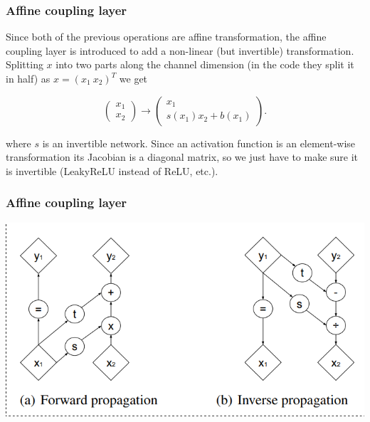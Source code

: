 \documentclass{beamer}
\begin{document}
\begin{frame}
  \frametitle{Affine coupling layer}

  Since both of the previous operations are affine transformation, the affine
  coupling layer is introduced to add a non-linear (but invertible)
  transformation. Splitting $x$ into two parts along the channel dimension (in
  the code they split it in half) as $x = (x_1\  x_2)^T$ we get

  \[
    \begin{pmatrix} x_1 \\ x_2 \end{pmatrix} \rightarrow
    \begin{pmatrix} x_1 \\ s(x_1) x_2 + b(x_1) \end{pmatrix}.
  \]

  where $s$ is an invertible network. Since an activation function is an
  element-wise transformation its Jacobian is a diagonal matrix, so we just
  have to make sure it is invertible (LeakyReLU instead of ReLU, etc.).
\end{frame}

\begin{frame}
  \frametitle{Affine coupling layer}

  \includegraphics[width=1.0\textwidth]{glow-affine-coupling.png}
\end{frame}
\end{document}
